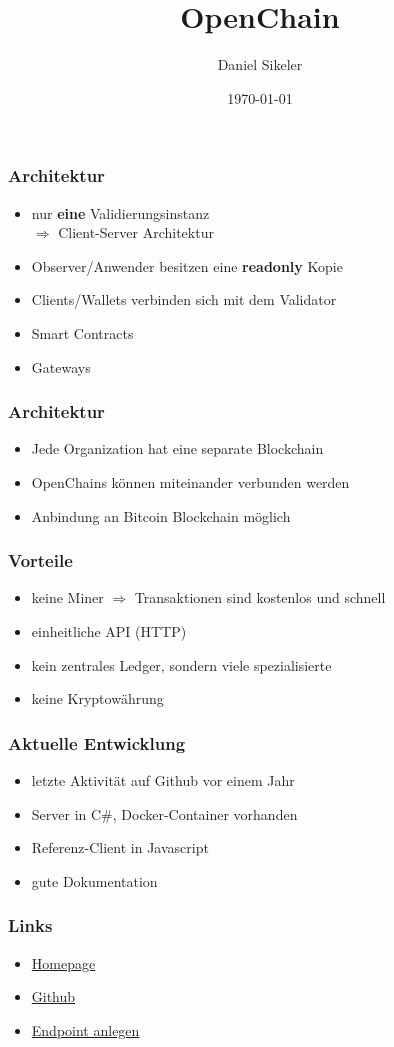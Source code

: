 \documentclass[17pt]{beamer}
\title{OpenChain}
\author{Daniel Sikeler}
\date{\today}
\begin{document}
\maketitle

\begin{frame}
\frametitle{Architektur}
\begin{itemize}
	\item nur \textbf{eine} Validierungsinstanz \\ $\Rightarrow$ Client-Server Architektur
	\item Observer/Anwender besitzen eine \textbf{readonly} Kopie
	\item Clients/Wallets verbinden sich mit dem Validator
	\item Smart Contracts
	\item Gateways
\end{itemize}
\end{frame}

\begin{frame}
\frametitle{Architektur}
\begin{itemize}
	\item Jede Organization hat eine separate Blockchain
	\item OpenChains können miteinander verbunden werden
	\item Anbindung an Bitcoin Blockchain möglich
\end{itemize}
\end{frame}

\begin{frame}
\frametitle{Vorteile}
\begin{itemize}
	\item keine Miner $\Rightarrow$ Transaktionen sind kostenlos und schnell
	\item einheitliche API (HTTP)
	\item kein zentrales Ledger, sondern viele spezialisierte
	\item keine Kryptowährung
\end{itemize}
\end{frame}

\begin{frame}
\frametitle{Aktuelle Entwicklung}
\begin{itemize}
	\item letzte Aktivität auf Github vor einem Jahr
	\item Server in C\#, Docker-Container vorhanden
	\item Referenz-Client in Javascript
	\item gute Dokumentation
\end{itemize}
\end{frame}
	
\begin{frame}
	\frametitle{Links}
	\begin{itemize}
		\item \href{https://www.openchain.org/}{Homepage}
		\item \href{https://github.com/openchain}{Github}
		\item \href{https://wallet.openchain.org/\#/addendpoint}{Endpoint anlegen}
	\end{itemize}
\end{frame}
\end{document}
